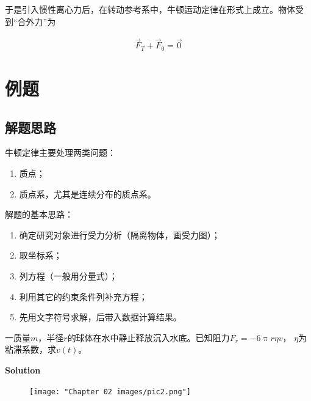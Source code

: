 \documentclass[
	12pt, %
	a4paper, %
]{myLegrandOrangeBook}
\begin{document}
    于是引入惯性离心力后，在转动参考系中，牛顿运动定律在形式上成立。物体受到“合外力”为

    \begin{align*}
        \overrightarrow{F}_{T} + \overrightarrow{F}_{0} = \overrightarrow{0}
    \end{align*}

\section{例题}

\subsection*{解题思路}

    牛顿定律主要处理两类问题：

    \begin{enumerate}
        \item 质点；
        \item 质点系，尤其是连续分布的质点系。
    \end{enumerate}

    解题的基本思路：

    \begin{enumerate}
        \item 确定研究对象进行受力分析（隔离物体，画受力图）；
        \item 取坐标系；
        \item 列方程（一般用分量式）；
        \item 利用其它的约束条件列补充方程；
        \item 先用文字符号求解，后带入数据计算结果。
    \end{enumerate}

    \vspace{2em}
    \begin{exercise}

        一质量\(m\)，半径\(r\)的球体在水中静止释放沉入水底。已知阻力\(F_{r} = - 6 \uppi r \eta v\)，
        \(\eta\)为粘滞系数，求\(v\left(t\right)\)。

    \end{exercise}

        \textbf{Solution}
        \vspace{1em}


    \begin{figure}
        \centering
        \texttt{[image: "Chapter 02 images/pic2.png"]}
        \label{pic2}
    \end{figure}
\end{document}
